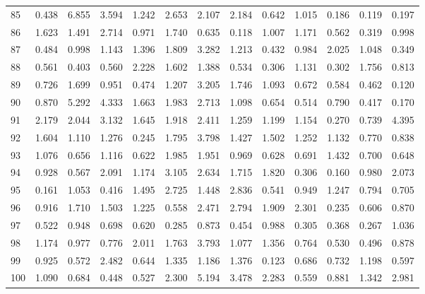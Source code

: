 \begin{tabular}{lrrrrrrrrrrrr}
85  &  0.438 &  6.855 &  3.594 &  1.242 &  2.653 &  2.107 &  2.184 &  0.642 &  1.015 &  0.186 &  0.119 &  0.197 \\
86  &  1.623 &  1.491 &  2.714 &  0.971 &  1.740 &  0.635 &  0.118 &  1.007 &  1.171 &  0.562 &  0.319 &  0.998 \\
87  &  0.484 &  0.998 &  1.143 &  1.396 &  1.809 &  3.282 &  1.213 &  0.432 &  0.984 &  2.025 &  1.048 &  0.349 \\
88  &  0.561 &  0.403 &  0.560 &  2.228 &  1.602 &  1.388 &  0.534 &  0.306 &  1.131 &  0.302 &  1.756 &  0.813 \\
89  &  0.726 &  1.699 &  0.951 &  0.474 &  1.207 &  3.205 &  1.746 &  1.093 &  0.672 &  0.584 &  0.462 &  0.120 \\
90  &  0.870 &  5.292 &  4.333 &  1.663 &  1.983 &  2.713 &  1.098 &  0.654 &  0.514 &  0.790 &  0.417 &  0.170 \\
91  &  2.179 &  2.044 &  3.132 &  1.645 &  1.918 &  2.411 &  1.259 &  1.199 &  1.154 &  0.270 &  0.739 &  4.395 \\
92  &  1.604 &  1.110 &  1.276 &  0.245 &  1.795 &  3.798 &  1.427 &  1.502 &  1.252 &  1.132 &  0.770 &  0.838 \\
93  &  1.076 &  0.656 &  1.116 &  0.622 &  1.985 &  1.951 &  0.969 &  0.628 &  0.691 &  1.432 &  0.700 &  0.648 \\
94  &  0.928 &  0.567 &  2.091 &  1.174 &  3.105 &  2.634 &  1.715 &  1.820 &  0.306 &  0.160 &  0.980 &  2.073 \\
95  &  0.161 &  1.053 &  0.416 &  1.495 &  2.725 &  1.448 &  2.836 &  0.541 &  0.949 &  1.247 &  0.794 &  0.705 \\
96  &  0.916 &  1.710 &  1.503 &  1.225 &  0.558 &  2.471 &  2.794 &  1.909 &  2.301 &  0.235 &  0.606 &  0.870 \\
97  &  0.522 &  0.948 &  0.698 &  0.620 &  0.285 &  0.873 &  0.454 &  0.988 &  0.305 &  0.368 &  0.267 &  1.036 \\
98  &  1.174 &  0.977 &  0.776 &  2.011 &  1.763 &  3.793 &  1.077 &  1.356 &  0.764 &  0.530 &  0.496 &  0.878 \\
99  &  0.925 &  0.572 &  2.482 &  0.644 &  1.335 &  1.186 &  1.376 &  0.123 &  0.686 &  0.732 &  1.198 &  0.597 \\
100 &  1.090 &  0.684 &  0.448 &  0.527 &  2.300 &  5.194 &  3.478 &  2.283 &  0.559 &  0.881 &  1.342 &  2.981 \\
\bottomrule
\end{tabular}
